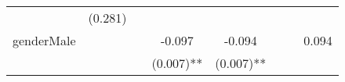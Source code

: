 \documentclass[12pt,twoside]{reedthesis}
\begin{document}
\begin{longtable}[]{@{}cccccccc@{}}
\begin{minipage}[t]{0.09\columnwidth}
  \strut
  \end{minipage} & \begin{minipage}[t]{0.10\columnwidth}\centering\strut
  (0.281)\strut
  \end{minipage}\tabularnewline
  \begin{minipage}[t]{0.12\columnwidth}\centering\strut
  genderMale\strut
  \end{minipage} & \begin{minipage}[t]{0.09\columnwidth}\centering\strut
  \strut
  \end{minipage} & \begin{minipage}[t]{0.09\columnwidth}\centering\strut
  \strut
  \end{minipage} & \begin{minipage}[t]{0.09\columnwidth}\centering\strut
  -0.097\strut
  \end{minipage} & \begin{minipage}[t]{0.09\columnwidth}\centering\strut
  -0.094\strut
  \end{minipage} & \begin{minipage}[t]{0.09\columnwidth}\centering\strut
  \strut
  \end{minipage} & \begin{minipage}[t]{0.09\columnwidth}\centering\strut
  \strut
  \end{minipage} & \begin{minipage}[t]{0.10\columnwidth}\centering\strut
  0.094\strut
  \end{minipage}\tabularnewline
  \begin{minipage}[t]{0.12\columnwidth}\centering\strut
  \strut
  \end{minipage} & \begin{minipage}[t]{0.09\columnwidth}\centering\strut
  \strut
  \end{minipage} & \begin{minipage}[t]{0.09\columnwidth}\centering\strut
  \strut
  \end{minipage} & \begin{minipage}[t]{0.09\columnwidth}\centering\strut
  (0.007)**\strut
  \end{minipage} & \begin{minipage}[t]{0.09\columnwidth}\centering\strut
  (0.007)**\strut
  \end{minipage} & \begin{minipage}[t]{0.09\columnwidth}\centering\strut
  \strut
  \end{minipage} & \begin{minipage}[t]{0.09\columnwidth}\centering\strut

\end{minipage}
\end{longtable}
\end{document}
